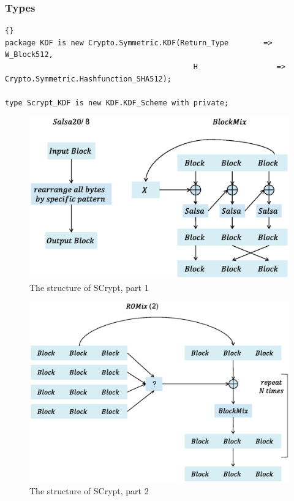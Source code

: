 \subsubsection*{Types}
\begin{lstlisting}{}
package KDF is new Crypto.Symmetric.KDF(Return_Type        => W_Block512,
                                           H                  => Crypto.Symmetric.Hashfunction_SHA512);

type Scrypt_KDF is new KDF.KDF_Scheme with private;

\end{lstlisting}

\begin{figure}[ht!]
\centering
\includegraphics[width=150mm]{./images/Scrypta}
\caption{The structure of SCrypt, part 1}
\end{figure}

\begin{figure}[ht!]
\centering
\includegraphics[width=150mm]{./images/Scryptb}
\caption{The structure of SCrypt, part 2}
\end{figure}

